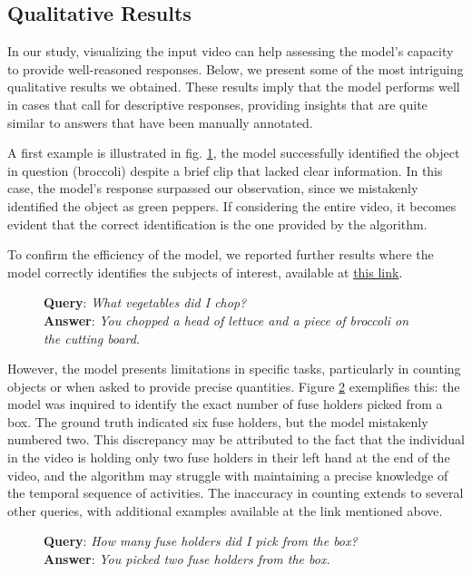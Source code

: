 \documentclass[10pt,twocolumn,letterpaper]{article}
\begin{document}
\subsection{Qualitative Results}
In our study, visualizing the input video can help assessing the model's capacity to provide well-reasoned responses. Below, we present some of the most intriguing qualitative results we obtained. These results imply that the model performs well in cases that call for descriptive responses, providing insights that are quite similar to answers that have been manually annotated.

A first example is illustrated in fig. \ref{fig:animation1}, the model successfully identified the object in question (broccoli) despite a brief clip that lacked clear information. In this case, the model's response surpassed our observation, since we mistakenly identified the object as green peppers. If considering the entire video, it becomes evident that the correct identification is the one provided by the algorithm.

To confirm the efficiency of the model, we reported further results where the model correctly identifies the subjects of interest, available at \href{https://github.com/Gin549/episodic-memory-pers/tree/main/qualitative_results}{this link}.

\begin{figure}[ht]
  \centering
  \captionsetup{justification=centering} %
  \caption{\textbf{Query}: \textit{What vegetables did I chop?} \\\textbf{Answer}: \textit{You chopped a head of lettuce and a piece of broccoli on the cutting board.}}
  \label{fig:animation1}
\end{figure}


However, the model presents limitations in specific tasks, particularly in counting objects or when asked to provide precise quantities. Figure \ref{fig:animation2} exemplifies this: the model was inquired to identify the exact number of fuse holders picked from a box. The ground truth indicated six fuse holders, but the model mistakenly numbered two. This discrepancy may be attributed to the fact that the individual in the video is holding only two fuse holders in their left hand at the end of the video, and the algorithm may struggle with maintaining a precise knowledge of the temporal sequence of activities.
The inaccuracy in counting extends to several other queries, with additional examples available at the link mentioned above.
\begin{figure}[ht]
  \centering
  \captionsetup{justification=centering} %
    \caption{\textbf{Query}: \textit{How many fuse holders did I pick from the box?} \\\textbf{Answer}: \textit{You picked two fuse holders from the box.}}
  \label{fig:animation2}
\end{figure}
\end{document}
